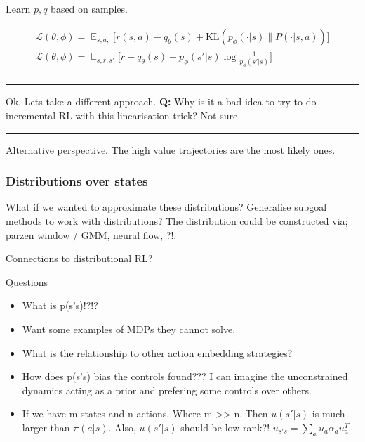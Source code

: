 Learn \(p, q\) based on samples.

\begin{align}
\mathcal L(\theta, \phi) = \mathop{\mathbb E}_{s, a,} \bigg[ r(s, a) - q_\theta(s) + \text{KL}(p_\phi(\cdot | s) \parallel P(\cdot | s, a)) \bigg]\\
\mathcal L(\theta, \phi) = \mathop{\mathbb E}_{s, r, s'} \bigg[r - q_\theta(s) - p_\phi(s' | s) \log \frac{1}{ p_\phi(s' | s)} \bigg] \\
\end{align}

\begin{center}\rule{0.5\linewidth}{\linethickness}\end{center}

Ok. Lets take a different approach. \textbf{Q:} Why is it a bad idea to
try to do incremental RL with this linearisation trick? Not sure.

\begin{center}\rule{0.5\linewidth}{\linethickness}\end{center}

Alternative perspective. The high value trajectories are the most likely
ones.

\hypertarget{distributions-over-states}{%
\subsubsection{Distributions over
states}\label{distributions-over-states}}

What if we wanted to approximate these distributions? Generalise subgoal
methods to work with distributions? The distribution could be
constructed via; parzen window / GMM, neural flow, ?!.

Connections to distributional RL?

Questions

\begin{itemize}
\tightlist
\item
  What is p(s'\textbar{}s)!?!?
\item
  Want some examples of MDPs they cannot solve.
\item
  What is the relationship to other action embedding strategies?
\item
  How does p(s'\textbar{}s) bias the controls found??? I can imagine the
  unconstrained dynamics acting as a prior and prefering some controls
  over others.
\item
  If we have m states and n actions. Where m
  \textgreater{}\textgreater{} n. Then \(u(s'|s)\) is much larger than
  \(\pi(a|s)\). Also, \(u(s'|s)\) should be low rank?!
  \(u_{s's} = \sum_a u_a \alpha_a u_a^T\)
\end{itemize}

